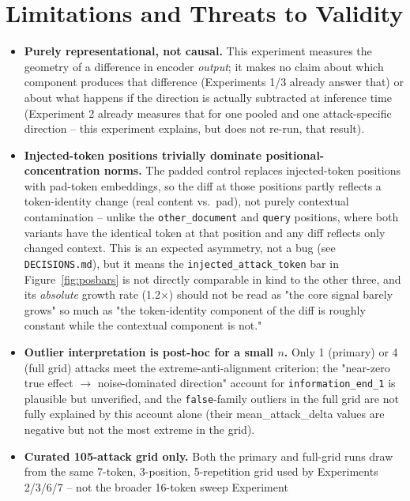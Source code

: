 \documentclass[11pt]{article}
\begin{document}
\section{Limitations and Threats to Validity}

\begin{itemize}
  \item \textbf{Purely representational, not causal.} This experiment
  measures the geometry of a difference in encoder \emph{output}; it makes
  no claim about which component produces that difference (Experiments 1/3
  already answer that) or about what happens if the direction is actually
  subtracted at inference time (Experiment 2 already measures that for one
  pooled and one attack-specific direction -- this experiment explains,
  but does not re-run, that result).
  \item \textbf{Injected-token positions trivially dominate positional-
  concentration norms.} The padded control replaces injected-token
  positions with pad-token embeddings, so the diff at those positions
  partly reflects a token-identity change (real content vs.\ pad), not
  purely contextual contamination -- unlike the \texttt{other\_document}
  and \texttt{query} positions, where both variants have the identical
  token at that position and any diff reflects only changed context. This
  is an expected asymmetry, not a bug (see \texttt{DECISIONS.md}), but it
  means the \texttt{injected\_attack\_token} bar in
  Figure~\ref{fig:posbars} is not directly comparable in kind to the other
  three, and its \emph{absolute} growth rate (1.2$\times$) should not be
  read as "the core signal barely grows" so much as "the token-identity
  component of the diff is roughly constant while the contextual component
  is not."
  \item \textbf{Outlier interpretation is post-hoc for a small $n$.} Only
  1 (primary) or 4 (full grid) attacks meet the extreme-anti-alignment
  criterion; the "near-zero true effect $\to$ noise-dominated direction"
  account for \texttt{information\_end\_1} is plausible but unverified,
  and the \texttt{false}-family outliers in the full grid are not fully
  explained by this account alone (their mean\_attack\_delta values are
  negative but not the most extreme in the grid).
  \item \textbf{Curated 105-attack grid only.} Both the primary and
  full-grid runs draw from the same 7-token, 3-position, 5-repetition grid
  used by Experiments 2/3/6/7 -- not the broader 16-token sweep Experiment

\end{itemize}
\end{document}
